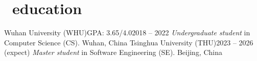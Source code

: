 \documentclass{common}
\begin{document}
\vspace{0.3ex}

\vspace{0.5ex}

\section{\faGraduationCap\ education}
\educationsubsection
    {Wuhan University (WHU)}{GPA: 3.65/4.0}{2018 -- 2022}
    {\textit{Undergraduate student} in Computer Science (CS). }{Wuhan, China}
\educationsubsectionwithoutgpa
    {Tsinghua University (THU)}{2023 -- 2026 (expect)}
    {\textit{Master student} in Software Engineering (SE). }{Beijing, China}

\vspace{0.85ex}
\end{document}
